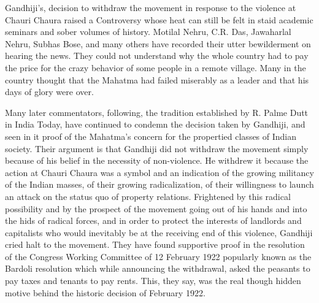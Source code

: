 Gandhiji's, decision to withdraw the movement in response to the violence at Chauri Chaura raised a Controversy whose heat can still be felt in staid academic seminars and sober volumes of history. Motilal Nehru, C.R. Das, Jawaharlal Nehru, Subhas Bose, and many others have recorded their utter bewilderment on hearing the news. They could not understand why the whole country had to pay the price for the crazy behavior of some people in a remote village. Many in the country thought that the Mahatma had failed miserably as a leader and that his days of glory were over. 

Many later commentators, following, the tradition established by R. Palme Dutt in India Today, have continued to condemn the decision taken by Gandhiji, and seen in it proof of the Mahatma's concern for the propertied classes of Indian society. Their argument is that Gandhiji did not withdraw the movement simply because of his belief in the necessity of non-violence. He withdrew it because the action at Chauri Chaura was a symbol and an indication of the growing militancy of the Indian masses, of their growing radicalization, of their willingness to launch an attack on the status quo of property relations. Frightened by this radical possibility and by the prospect of the movement going out of his hands and into the hids of radical forces, and in order to protect the interests of landlords and capitalists who would inevitably be at the receiving end of this violence, Gandhiji cried halt to the movement. They have found supportive proof in the resolution of the Congress Working Committee of 12 February 1922 popularly known as the Bardoli resolution which while announcing the withdrawal, asked the peasants to pay taxes and tenants to pay rents. This, they say, was the real though hidden motive behind the historic decision of February 1922. 


